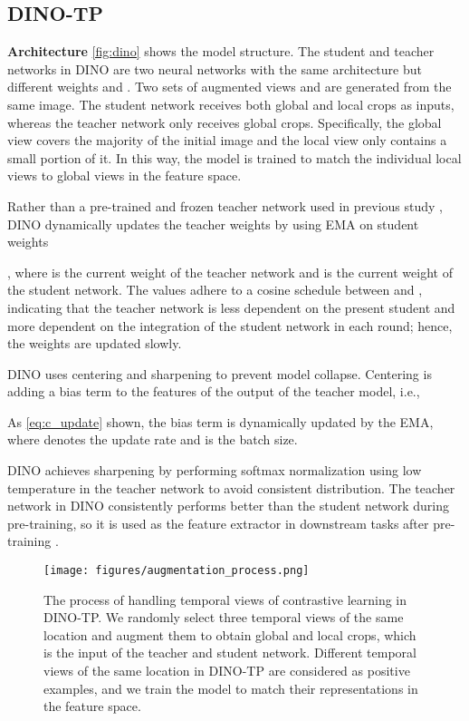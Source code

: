 \documentclass[10pt,twocolumn,letterpaper]{article}
\begin{document}
\subsection{DINO-TP}
\label{section:dino-tp}
\textbf{Architecture }
\cref{fig:dino} shows the model structure.
The student and teacher networks in DINO are two neural networks with the same architecture  but different weights  and .
Two sets of augmented views  and  are generated from the same image.
The student network receives both global and local crops as inputs, whereas the teacher network only receives global crops.
Specifically, the global view covers the majority of the initial image and the local view only contains a small portion of it.
In this way, the model is trained to match the individual local views to global views in the feature space.

Rather than a pre-trained and frozen teacher network used in previous study \cite{fang2021seed,chen2020big}, DINO dynamically updates the teacher weights by using EMA on student weights  

, where  is the current weight of the teacher network and  is the current weight of the student network.
The  values adhere to a cosine schedule between  and , indicating that the teacher network is less dependent on the present student and more dependent on the integration of the student network in each round; hence, the weights are updated slowly.

DINO uses centering and sharpening to prevent model collapse.
Centering is adding a bias term  to the features of the output of the teacher model, i.e., 

As \cref{eq:c_update} shown, the bias term  is dynamically updated by the EMA, where  denotes the update rate and  is the batch size.

DINO achieves sharpening by performing softmax normalization using low temperature in the teacher network to avoid consistent distribution.
The teacher network in DINO consistently performs better than the student network during pre-training, so it is used as the feature extractor in downstream tasks after pre-training \cite{caron2021emerging}.

\begin{figure*}
  \centering
  \texttt{[image: figures/augmentation\_process.png]}
  \caption{
  The process of handling temporal views of contrastive learning in DINO-TP.
  We randomly select three temporal views of the same location and augment them to obtain global and local crops, which is the input of the teacher and student network.
  Different temporal views of the same location in DINO-TP are considered as positive examples, and we train the model to match their representations in the feature space.
  }
  \label{fig:temporal_aug}
\end{figure*}
\end{document}
